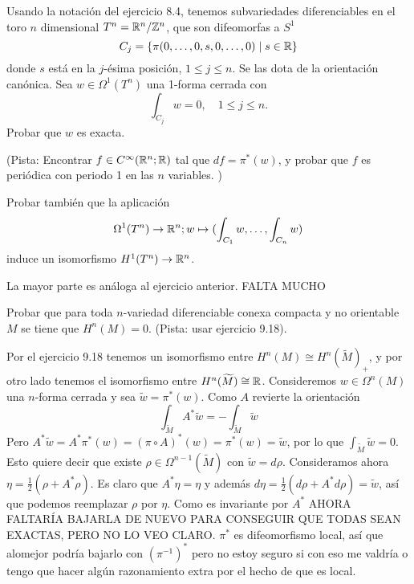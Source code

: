 \documentclass[twoside]{article}
\begin{document}
\begin{ejercicio}{10.3}
Usando la notación del ejercicio 8.4, tenemos subvariedades diferenciables en el toro $n$ dimensional $T^n=\mathbb{R}^n/\mathbb{Z}^n$, que son difeomorfas a $S^1$
\[
C_j=\{\pi(0,\dots, 0,s,0,\dots, 0)\mid s\in\mathbb{R}\}
\]
donde $s$ está en la $j$-ésima posición, $1\leq j\leq n$. Se las dota de la orientación canónica. Sea $w\in\Omega^1(T^n)$ una 1-forma cerrada con 
\[
\int_{C_j}w=0,\quad 1\leq j\leq n.
\]
Probar que $w$ es exacta. 

(Pista: Encontrar $f\in C^{\infty}(\mathbb{R}^n;\mathbb{R})$ tal que $df=\pi^*(w)$, y probar que $f$ es periódica con periodo 1 en las $n$ variables. )

Probar también que la aplicación
\[
\Omega^1(T^n)\to\mathbb{R}^n; w\mapsto (\int_{C_1}w,\dots, \int_{C_n}w)
\]
induce un isomorfismo $H^1(T^n)\to\mathbb{R}^n$. 
\end{ejercicio}
\begin{solucion}
La mayor parte es análoga al ejercicio anterior.
FALTA MUCHO
\end{solucion}
\newpage

\begin{ejercicio}{10.4}
Probar que para toda $n$-variedad diferenciable conexa compacta y no orientable $M$ se tiene que $H^n(M)=0$. (Pista: usar ejercicio 9.18).
\end{ejercicio}
\begin{solucion}
Por el ejercicio 9.18 tenemos un isomorfismo entre $H^n(M)\cong H^n(\widetilde{M})_+$, y por otro lado tenemos el isomorfismo entre $H^n(\widetilde{M})\cong\mathbb{R}$. Consideremos $w\in\Omega^n(M)$ una $n$-forma cerrada y sea $\tilde{w}=\pi^*(w)$. Como $A$ revierte la orientación
\[
\int_{\widetilde{M}} A^*\tilde{w}=-\int_{\widetilde{M}} \tilde{w}
\]
Pero $A^*\tilde{w}=A^*\pi^*(w)=(\pi\circ A)^*(w)=\pi^*(w)=\tilde{w}$, por lo que $\int_{\widetilde{M}} \tilde{w}=0$. Esto quiere decir que existe $\rho\in\Omega^{n-1}(\widetilde{M})$ con $\tilde{w}=d\rho$. Consideramos ahora $\eta=\frac{1}{2}(\rho+A^*\rho)$. Es claro que $A^*\eta=\eta$ y además $d\eta=\frac{1}{2}(d\rho+A^*d\rho)=\tilde{w}$, así que podemos reemplazar $\rho$ por $\eta$. Como es invariante por $A^*$ AHORA FALTARÍA BAJARLA DE NUEVO PARA CONSEGUIR QUE TODAS SEAN EXACTAS, PERO NO LO VEO CLARO. $\pi^*$ es difeomorfismo local, así que alomejor podría bajarlo con $(\pi^{-1})^*$ pero no estoy seguro si con eso me valdría o tengo que hacer algún razonamiento extra por el hecho de que es local.
\end{solucion}

\newpage
\end{document}

